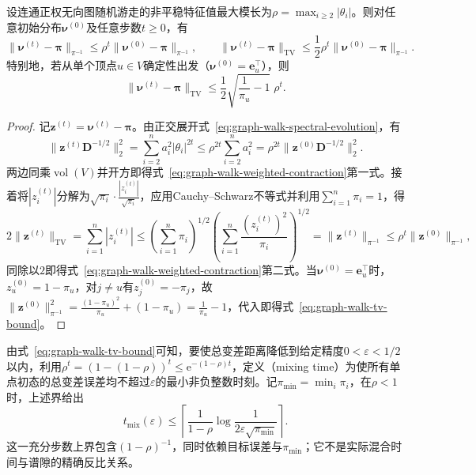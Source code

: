 \begin{theorem}[谱间隙与总变差收敛速度]
\label{prop:graph-walk-tv-bound}
设连通正权无向图随机游走的非平稳特征值最大模长为$\rho=\max_{i\geq 2}|\theta_i|$。则对任意初始分布$\bm\nu^{(0)}$及任意步数$t\geq 0$，有
\begin{equation}
\lVert\bm{\nu}^{(t)}-\bm{\pi}\rVert_{\pi^{-1}}
\le\rho^t\lVert\bm{\nu}^{(0)}-\bm{\pi}\rVert_{\pi^{-1}},
\qquad
\lVert\bm{\nu}^{(t)}-\bm{\pi}\rVert_{\mathrm{TV}}
\le\frac12\rho^t\lVert\bm{\nu}^{(0)}-\bm{\pi}\rVert_{\pi^{-1}}.
\label{eq:graph-walk-weighted-contraction}
\end{equation}
特别地，若从单个顶点$u\in V$确定性出发（$\bm\nu^{(0)}=\bm e_u^\top$），则
\begin{equation}
\lVert\bm{\nu}^{(t)}-\bm{\pi}\rVert_{\mathrm{TV}}
\le\frac12\sqrt{\frac{1}{\pi_u}-1}\;\rho^t.
\label{eq:graph-walk-tv-bound}
\end{equation}
\end{theorem}

\begin{proof}
记$\bm z^{(t)}=\bm\nu^{(t)}-\bm\pi$。由正交展开式~\eqref{eq:graph-walk-spectral-evolution}，有
\[
\lVert\bm{z}^{(t)}\bm{D}^{-1/2}\rVert_2^2
=\sum_{i=2}^n a_i^2|\theta_i|^{2t}
\le \rho^{2t}\sum_{i=2}^n a_i^2
=\rho^{2t}\lVert\bm{z}^{(0)}\bm{D}^{-1/2}\rVert_2^2.
\]
两边同乘$\operatorname{vol}(V)$并开方即得式~\eqref{eq:graph-walk-weighted-contraction}第一式。接着将$|z_i^{(t)}|$分解为$\sqrt{\pi_i}\cdot\frac{|z_i^{(t)}|}{\sqrt{\pi_i}}$，应用Cauchy--Schwarz不等式并利用$\sum_{i=1}^n\pi_i=1$，得
\[
2\lVert\bm z^{(t)}\rVert_{\mathrm{TV}}
=\sum_{i=1}^n|z_i^{(t)}|
\le\left(\sum_{i=1}^n\pi_i\right)^{1/2}
   \left(\sum_{i=1}^n \frac{(z_i^{(t)})^2}{\pi_i}\right)^{1/2}
=\lVert\bm{z}^{(t)}\rVert_{\pi^{-1}}
\le\rho^t\lVert\bm{z}^{(0)}\rVert_{\pi^{-1}},
\]
同除以$2$即得式~\eqref{eq:graph-walk-weighted-contraction}第二式。当$\bm\nu^{(0)}=\bm e_u^\top$时，$z_u^{(0)}=1-\pi_u$，对$j\neq u$有$z_j^{(0)}=-\pi_j$，故$\lVert\bm z^{(0)}\rVert_{\pi^{-1}}^2=\frac{(1-\pi_u)^2}{\pi_u}+(1-\pi_u)=\frac{1}{\pi_u}-1$，代入即得式~\eqref{eq:graph-walk-tv-bound}。
\end{proof}

由式~\eqref{eq:graph-walk-tv-bound}可知，要使总变差距离降低到给定精度$0<\varepsilon<1/2$以内，利用$\rho^t=(1-(1-\rho))^t\leq\mathrm e^{-(1-\rho)t}$，定义（mixing time）为使所有单点初态的总变差误差均不超过$\varepsilon$的最小非负整数时刻。记$\pi_{\min}=\min_i\pi_i$，在$\rho<1$时，上述界给出
\begin{equation}
  t_{\mathrm{mix}}(\varepsilon) \leq \left\lceil\frac{1}{1-\rho}\log\frac{1}{2\varepsilon\sqrt{\pi_{\min}}}\right\rceil.
  \label{eq:graph-walk-mixing-time-bound}
\end{equation}
这一充分步数上界包含$(1-\rho)^{-1}$，同时依赖目标误差与$\pi_{\min}$；它不是实际混合时间与谱隙的精确反比关系。

